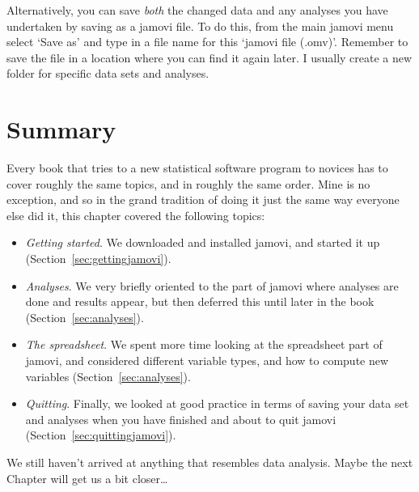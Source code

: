 Alternatively, you can save {\it both} the changed data and any analyses you have undertaken by saving as a jamovi file. To do this, from the main jamovi menu select `Save as' and type in a file name for this `jamovi file (.omv)'. Remember to save the file in a location where you can find it again later. I usually create a new folder for specific data sets and analyses.  


\section{Summary}

Every book that tries to a new statistical software program to novices has to cover roughly the same topics, and in roughly the same order. Mine is no exception, and so in the grand tradition of doing it just the same way everyone else did it, this chapter covered the following topics:

\begin{itemize}
\item {\it Getting started}. We downloaded and installed jamovi, and started it up (Section~\ref{sec:gettingjamovi}).
\item {\it Analyses}. We very briefly oriented to the part of jamovi where analyses are done and results appear, but then deferred this until later in the book (Section~\ref{sec:analyses}).
\item {\it The spreadsheet}. We spent more time looking at the spreadsheet part of jamovi, and considered different variable types, and how to compute new variables (Section~\ref{sec:analyses}).
\item {\it Quitting}. Finally, we looked at good practice in terms of saving your data set and analyses when you have finished and about to quit jamovi (Section~\ref{sec:quittingjamovi}).

\end{itemize}

\noindent
We still haven't arrived at anything that resembles data analysis. Maybe the next Chapter will get us a bit closer\ldots




